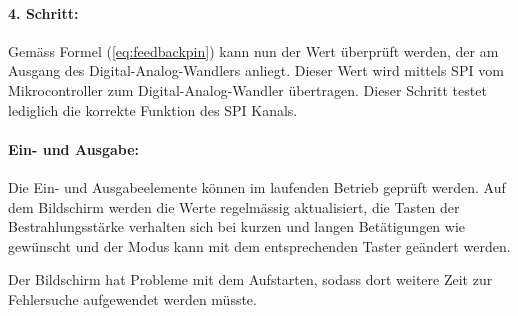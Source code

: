 \paragraph{4. Schritt:}
Gemäss Formel (\ref{eq:feedbackpin}) kann nun der Wert überprüft werden, der am Ausgang des Digital-Analog-Wand\-lers anliegt. Dieser Wert wird mittels SPI vom Mikrocontroller zum Digital-Analog-Wand\-ler übertragen. Dieser Schritt testet lediglich die korrekte Funktion des SPI Kanals.

\paragraph{Ein- und Ausgabe:}
Die Ein- und Ausgabeelemente können im laufenden Betrieb geprüft werden. Auf dem Bildschirm werden die Werte regelmässig aktualisiert, die Tasten der Bestrahlungsstärke verhalten sich bei kurzen und langen Betätigungen wie gewünscht und der Modus kann mit dem entsprechenden Taster geändert werden. 

Der Bildschirm hat Probleme mit dem Aufstarten, sodass dort weitere Zeit zur Fehlersuche aufgewendet werden müsste.